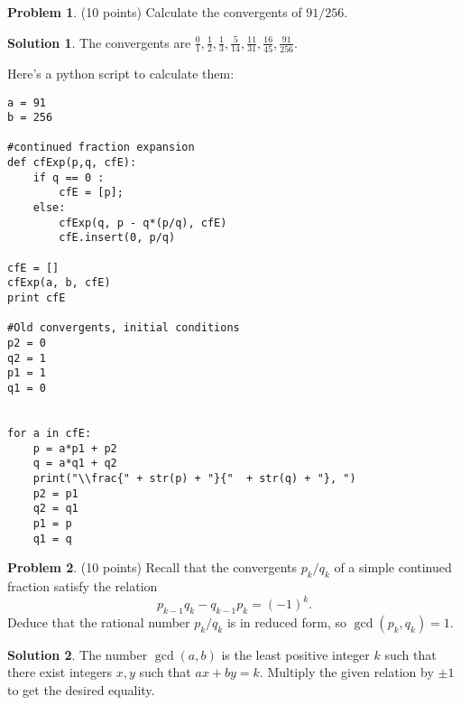 \documentclass{article}
\theoremstyle{definition}
\newtheorem{problem}{Problem}
\newtheorem*{solution}{Solution}
\begin{document}
\begin{problem} (10 points)
Calculate the convergents of $91/256$. 
\end{problem}
\begin{solution}
The convergents are $\frac{0}{1}, 
\frac{1}{2}, 
\frac{1}{3}, 
\frac{5}{14}, 
\frac{11}{31}, 
\frac{16}{45}, 
\frac{91}{256}$.  

Here's a python script to calculate them:

\begin{verbatim}
a = 91
b = 256

#continued fraction expansion
def cfExp(p,q, cfE):
    if q == 0 :
        cfE = [p];
    else:
        cfExp(q, p - q*(p/q), cfE)
        cfE.insert(0, p/q)

cfE = []
cfExp(a, b, cfE)
print cfE

#Old convergents, initial conditions
p2 = 0
q2 = 1
p1 = 1
q1 = 0


for a in cfE:
    p = a*p1 + p2 
    q = a*q1 + q2
    print("\\frac{" + str(p) + "}{"  + str(q) + "}, ")
    p2 = p1
    q2 = q1
    p1 = p
    q1 = q
\end{verbatim}

\end{solution}

\begin{problem} (10 points) 
Recall that the convergents $p_k/q_k$ of a simple continued fraction satisfy the relation
$$ p_{k-1}q_k-q_{k-1}p_k = (-1)^k.$$
Deduce that the rational number $p_k/q_k$ is in reduced form, so $\gcd(p_k, q_k)=1$. 
\end{problem}
\begin{solution}
The number $\gcd(a,b)$ is the least positive integer $k$ such that there exist integers $x,y$ such that
$ax + by = k$.  Multiply the given relation by $\pm 1$ to get the desired equality.
\end{solution}
\end{document}
